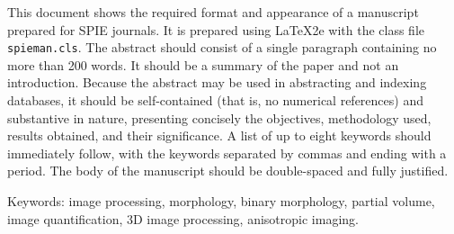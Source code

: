 
This document shows the required format and appearance of a manuscript prepared for SPIE journals. It is prepared using LaTeX2e with the class file \texttt{spieman.cls}. The abstract should consist of a single paragraph containing no more than 200 words. It should be a summary of the paper and not an introduction. Because the abstract may be used in abstracting and indexing databases, it should be self-contained (that is, no numerical references) and substantive in nature, presenting concisely the objectives, methodology used, results obtained, and their significance. A list of up to eight keywords should immediately follow, with the keywords separated by commas and ending with a period. The body of the manuscript should be double-spaced and fully justified.

Keywords: image processing, morphology, binary morphology, partial volume, image quantification, 3D image processing, anisotropic imaging.